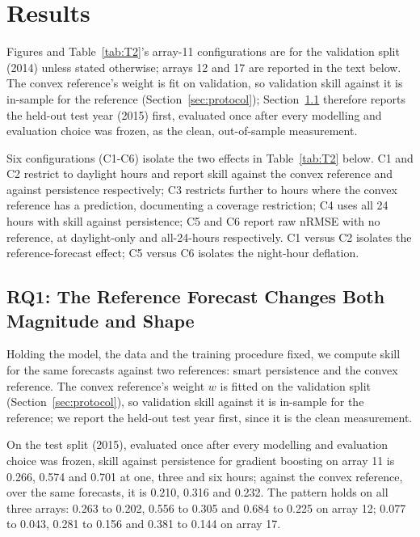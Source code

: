 \section{Results}
\label{sec:results}

Figures and Table~\ref{tab:T2}'s array-11 configurations are for the
validation split (2014) unless stated otherwise; arrays 12 and 17 are
reported in the text below. The convex reference's weight is fit on
validation, so validation skill against it is in-sample for the
reference (Section~\ref{sec:protocol}); Section~\ref{sec:rq1-reference}
therefore reports the held-out test year (2015) first, evaluated once
after every modelling and evaluation choice was frozen, as the clean,
out-of-sample measurement.

Six configurations (C1-C6) isolate the two effects in
Table~\ref{tab:T2} below. C1 and C2 restrict to daylight hours and
report skill against the convex reference and against persistence
respectively; C3 restricts further to hours where the convex reference
has a prediction, documenting a coverage restriction; C4 uses all 24
hours with skill against persistence; C5 and C6 report raw nRMSE with
no reference, at daylight-only and all-24-hours respectively. C1
versus C2 isolates the reference-forecast effect; C5 versus C6
isolates the night-hour deflation.



\subsection{RQ1: The Reference Forecast Changes Both Magnitude and Shape}
\label{sec:rq1-reference}

Holding the model, the data and the training procedure fixed, we
compute skill for the same forecasts against two references: smart
persistence and the convex reference. The convex reference's weight
$w$ is fitted on the validation split (Section~\ref{sec:protocol}), so
validation skill against it is in-sample for the reference; we report
the held-out test year first, since it is the clean measurement.

On the test split (2015), evaluated once after every modelling and
evaluation choice was frozen, skill against persistence for gradient
boosting on array 11 is 0.266, 0.574 and 0.701 at one, three and six
hours; against the convex reference, over the same forecasts, it is
0.210, 0.316 and 0.232. The pattern holds on all three arrays: 0.263
to 0.202, 0.556 to 0.305 and 0.684 to 0.225 on array 12; 0.077 to
0.043, 0.281 to 0.156 and 0.381 to 0.144 on array 17.

